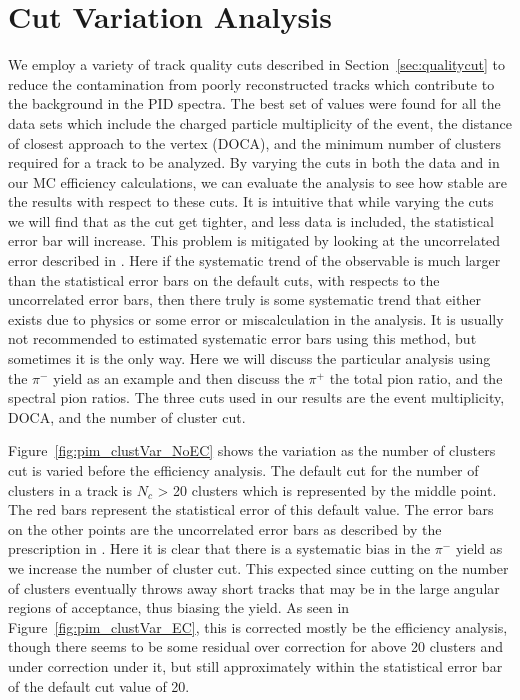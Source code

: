 \clearpage

\section{Cut Variation Analysis}
\label{sec:cutvar}

We employ a variety of track quality cuts described in Section~\ref{sec:qualitycut} to reduce the contamination from poorly reconstructed tracks which contribute to the background in the PID spectra. The best set of values were found for all the data sets which include the charged particle multiplicity of the event, the distance of closest approach to the vertex (DOCA), and the minimum number of clusters required for a track to be analyzed. By varying the cuts in both the data and in our MC efficiency calculations, we can evaluate the analysis to see how stable are the results with respect to these cuts. It is intuitive that while varying the cuts we will find that as the cut get tighter, and less data is included, the statistical error bar will increase. This problem is mitigated by looking at the uncorrelated error described in \cite{dataAnalysis}. Here if the systematic trend of the observable is much larger than the statistical error bars on the default cuts, with respects to the uncorrelated error bars, then there truly is some systematic trend that either exists due to physics or some error or miscalculation in the analysis. It is usually not recommended to estimated systematic error bars using this method, but sometimes it is the only way. Here we will discuss the particular analysis using the $\pi^-$ yield as an example and then discuss the $\pi^+$ the total pion ratio, and the spectral pion ratios. The three cuts used in our results are the event multiplicity, DOCA, and the number of cluster cut.


 Figure~\ref{fig:pim_clustVar_NoEC} shows the variation as the number of clusters cut is varied before the efficiency analysis. The default cut for the number of clusters in a track is $N_c$ > 20 clusters which is represented by the middle point. The red bars represent the statistical error of this default value. The error bars on the other points are the uncorrelated error bars as described by the prescription in \cite{dataAnalysis}. Here it is clear that there is a systematic bias in the $\pi^-$ yield as we increase the number of cluster cut. This expected since cutting on the number of clusters eventually throws away short tracks that may be in the large angular regions of acceptance, thus biasing the yield. As seen in Figure~\ref{fig:pim_clustVar_EC}, this is corrected mostly be the efficiency analysis, though there seems to be some residual over correction for above 20 clusters and under correction under it, but still approximately within the statistical error bar of the default cut value of 20. 
 
